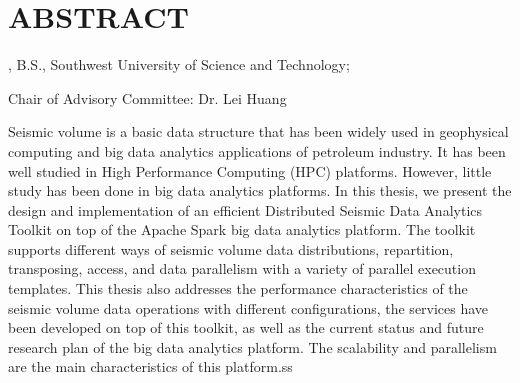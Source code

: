 %
%
%

\chapter*{ABSTRACT}

\pagestyle{plain} %
\setcounter{page}{2}

\begin{center}
\pvamumanuscripttitle

\pvamugradmonth \hspace{2pt} \pvamugradyear

\pvamufullname, B.S., Southwest University of Science and Technology;

Chair of Advisory Committee: Dr. Lei Huang 

\par\end{center}

\indent Seismic volume is a basic data structure that has been widely used in geophysical computing and big data analytics applications of petroleum industry. It has been well studied in High Performance Computing (HPC) platforms. However, little study has been done in big data analytics platforms. In this thesis, we present the design and implementation of an efficient Distributed Seismic Data Analytics Toolkit on top of the Apache Spark big data analytics platform. The toolkit supports different ways of seismic volume data distributions, repartition, transposing, access, and data parallelism with a variety of parallel execution templates. This thesis also addresses the performance characteristics of the seismic volume data operations with different configurations, the services have been developed on top of this toolkit, as well as the current status and future research plan of the big data analytics platform. The scalability and parallelism are the main characteristics of this platform.ss  


 

\pagebreak{}
